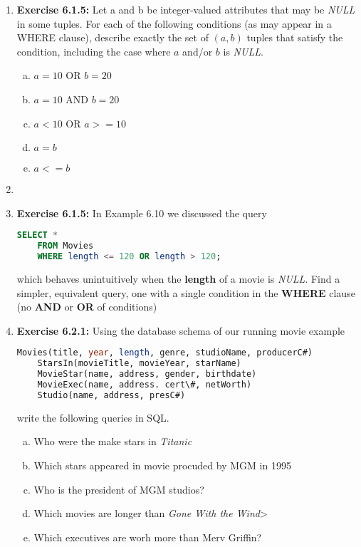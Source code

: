\documentclass[12pt]{article}
\begin{document}
\begin{enumerate}[1.]
    \item \textbf{Exercise 6.1.5:} Let a and b be integer-valued attributes that
    may be \textit{NULL} in some tuples. For each of the following conditions
    (as may appear in a WHERE clause), describe exactly the set of $(a, b)$ tuples
    that satisfy the condition, including the case where $a$ and/or $b$ is \textit{NULL}.

    \bigskip

    \begin{enumerate}[a)]
        \item $a = 10$ OR $b = 20$
        \item $a = 10$ AND $b = 20$
        \item $a < 10$ OR $a >= 10$
        \item $a = b$
        \item $a <= b$
    \end{enumerate}

    \item

    \item \textbf{Exercise 6.1.5:} In Example 6.10 we discussed the query

    \begin{lstlisting}[language=SQL]
    SELECT *
    FROM Movies
    WHERE length <= 120 OR length > 120;
    \end{lstlisting}

    \bigskip

    which behaves unintuitively when the \textbf{length} of a movie is \textit{NULL}.
    Find a simpler, equivalent query, one with a single condition in the \textbf{WHERE} clause
    (no \textbf{AND} or \textbf{OR} of conditions)

    \item \textbf{Exercise 6.2.1:} Using the database schema of our running movie
    example

    \begin{lstlisting}[language=SQL]
    Movies(title, year, length, genre, studioName, producerC#)
    StarsIn(movieTitle, movieYear, starName)
    MovieStar(name, address, gender, birthdate)
    MovieExec(name, address. cert\#, netWorth)
    Studio(name, address, presC#)
    \end{lstlisting}

    \bigskip

    write the following queries in SQL.

    \bigskip

    \begin{enumerate}[a)]
        \item Who were the make stars in \textit{Titanic}
        \item Which stars appeared in movie procuded by MGM in 1995
        \item Who is the president of MGM studios?
        \item Which movies are longer than \textit{Gone With the Wind}>
        \item Which executives are worh more than Merv Griffin?
    \end{enumerate}


\end{enumerate}
\end{document}
